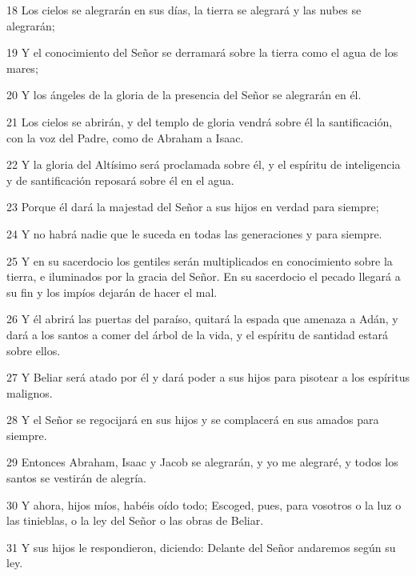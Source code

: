 \par 18 Los cielos se alegrarán en sus días, la tierra se alegrará y las nubes se alegrarán;

\par 19 Y el conocimiento del Señor se derramará sobre la tierra como el agua de los mares;

\par 20 Y los ángeles de la gloria de la presencia del Señor se alegrarán en él.

\par 21 Los cielos se abrirán, y del templo de gloria vendrá sobre él la santificación, con la voz del Padre, como de Abraham a Isaac.

\par 22 Y la gloria del Altísimo será proclamada sobre él, y el espíritu de inteligencia y de santificación reposará sobre él en el agua.

\par 23 Porque él dará la majestad del Señor a sus hijos en verdad para siempre;

\par 24 Y no habrá nadie que le suceda en todas las generaciones y para siempre.

\par 25 Y en su sacerdocio los gentiles serán multiplicados en conocimiento sobre la tierra, e iluminados por la gracia del Señor. En su sacerdocio el pecado llegará a su fin y los impíos dejarán de hacer el mal.

\par 26 Y él abrirá las puertas del paraíso, quitará la espada que amenaza a Adán, y dará a los santos a comer del árbol de la vida, y el espíritu de santidad estará sobre ellos.

\par 27 Y Beliar será atado por él y dará poder a sus hijos para pisotear a los espíritus malignos.

\par 28 Y el Señor se regocijará en sus hijos y se complacerá en sus amados para siempre.

\par 29 Entonces Abraham, Isaac y Jacob se alegrarán, y yo me alegraré, y todos los santos se vestirán de alegría.

\par 30 Y ahora, hijos míos, habéis oído todo; Escoged, pues, para vosotros o la luz o las tinieblas, o la ley del Señor o las obras de Beliar.

\par 31 Y sus hijos le respondieron, diciendo: Delante del Señor andaremos según su ley.


